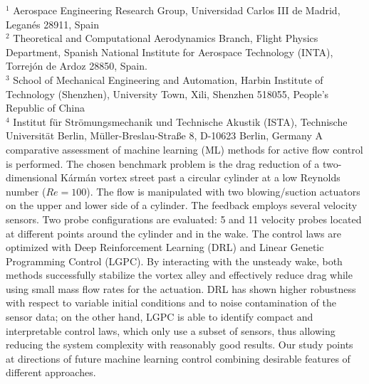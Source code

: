 %
%
%
%
%
%
%
\paperaffiliation
{%
  $^1$ Aerospace Engineering Research Group, Universidad Carlos III de Madrid, Legan\'{e}s 28911, Spain\\%
  $^2$ Theoretical and Computational Aerodynamics Branch, Flight Physics Department, Spanish National Institute for Aerospace Technology (INTA), Torrej\'on de Ardoz 28850, Spain. \\%
  $^3$ School of Mechanical Engineering and Automation, Harbin Institute of Technology (Shenzhen),  University Town, Xili, Shenzhen 518055, People’s Republic of China \\%
  $^4$ Institut für Strömungsmechanik und Technische Akustik (ISTA), Technische Universität Berlin, Müller-Breslau-Straße 8, D-10623 Berlin, Germany
}%
%
%
%
%
%
%
%
%
%
%
\papersummary%
{%
A comparative assessment of machine learning (ML) methods for active flow control is performed. The chosen benchmark problem is the drag reduction of a two-dimensional Kármán vortex street past a circular cylinder at a low Reynolds number ($Re=100$). 
The flow is manipulated with two blowing/suction actuators on the upper and lower side of a cylinder. The feedback employs several velocity sensors. Two probe configurations are evaluated: 5 and 11 velocity probes located at different points around the cylinder and in the wake. 
The control laws are optimized with Deep Reinforcement Learning (DRL) and Linear Genetic Programming Control (LGPC). 
By interacting with the unsteady wake, both methods successfully stabilize the vortex alley and effectively reduce drag while using small mass flow rates for the actuation. DRL has shown higher robustness with respect to variable initial conditions and to noise contamination of the sensor data; on the other hand, LGPC is able to identify compact and interpretable control laws, which only use a subset of sensors, thus allowing reducing the system complexity with reasonably good results. 
Our study points at directions of future machine learning control combining desirable features of different approaches.
}

